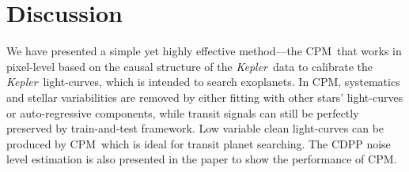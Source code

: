 \documentclass[12pt, preprint]{aastex}
\newcommand{\project}[1]{\textsl{#1}}
\newcommand{\Kepler}{\project{Kepler}}
\newcommand{\name}{CPM}
\begin{document}
\clearpage

\section{Discussion}
We have presented a simple yet highly effective method---the \name\ that works in pixel-level 
  based on the causal structure of the \Kepler\ data to calibrate the \Kepler\ light-curves, 
  which is intended to search exoplanets.
In \name, systematics and stellar variabilities are removed by
  either fitting with other stars' light-curves or auto-regressive components,
  while transit signals can still be perfectly preserved by train-and-test framework.
Low variable clean light-curves can be produced by \name\,  
  which is ideal for transit planet searching. 
The CDPP noise level estimation is also presented in the paper to show the performance of \name. 
\end{document}
